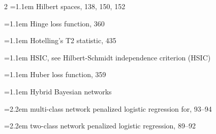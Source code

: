 \begin{multicols}{2}
\noindent\hangindent=1.1em Hilbert spaces, 138, 150, 152\par
\noindent\hangindent=1.1em Hinge loss function, 360\par
\noindent\hangindent=1.1em Hotelling's T2 statistic, 435\par
\noindent\hangindent=1.1em HSIC, see Hilbert-Schmidt independence criterion (HSIC)\par
\noindent\hangindent=1.1em Huber loss function, 359\par
\noindent\hangindent=1.1em Hybrid Bayesian networks\par
\noindent\hangindent=2.2em \hspace*{1.1em}multi-class network penalized logistic regression for, 93--94\par
\noindent\hangindent=2.2em \hspace*{1.1em}two-class network penalized logistic regression, 89--92\par


\end{multicols}
